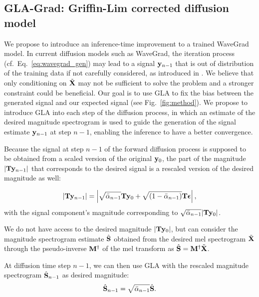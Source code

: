 \subsection{GLA-Grad: Griffin-Lim corrected diffusion model}
We propose to introduce an inference-time improvement to a trained WaveGrad model. 
In current diffusion models such as WaveGrad, the iteration process (cf.\ Eq.~\eqref{eq:wavegrad_gen}) may lead to a signal $\mathbf{y}_{n-1}$ that is out of distribution of the training data if not carefully considered, as introduced in \cite{graham2023denoising}. We believe that only conditioning on $\tilde{\mathbf{X}}$ may not be sufficient to solve the problem and a stronger constraint could be beneficial. 
 Our goal is to use GLA to fix the bias between the generated signal and our expected signal (see Fig.~\ref{fig:method}). 
We propose to introduce GLA into each step of the diffusion process, in which 
an estimate of the desired magnitude spectrogram  is used to guide the generation of the signal estimate $\mathbf{y}_{n-1}$ at step $n-1$,
enabling the inference to have a better convergence.
 
Because the signal at step $n-1$ of the forward diffusion process is supposed to be obtained from a scaled version of the original $\mathbf{y}_0$, the part of the magnitude $|\mathbf{T} \mathbf{y}_{n-1}|$ that corresponds to the desired signal is a rescaled version of the desired magnitude as well: 

\begin{equation}
        \left|\mathbf{T}\mathbf{y}_{n-1}\right| = \left|\sqrt{\bar{\alpha}_{n-1}}\mathbf{T}  \mathbf{y}_0+ \sqrt{\left(1-\bar{\alpha}_{n-1}\right)} \mathbf{T}  \boldsymbol{\epsilon} \right|,
\label{equ-Tyn}
\end{equation}
with the signal component's magnitude corresponding to $\sqrt{\bar{\alpha}_{n-1}}|\mathbf{T}  \mathbf{y}_0| $.

We do not have access to the desired magnitude $|\mathbf{T} \mathbf{y}_0|$, but can consider the magnitude spectrogram estimate $\hat{\mathbf{S}}$ obtained from the desired mel spectrogram $\tilde{\mathbf{X}}$ 
through the pseudo-inverse $\mathbf{M}^\dagger$ of the mel transform as $\hat{\mathbf{S}} = \mathbf{M}^\dagger \tilde{\mathbf{X}}$. 

At diffusion time step $n-1$, we can then use GLA with the rescaled magnitude spectrogram $\hat{\mathbf{S}}_{n-1}$ as desired magnitude:
\begin{equation}
\hat{\mathbf{S}}_{n-1} = \sqrt{\bar{\alpha}_{n-1}}\hat{\mathbf{S}}.
\end{equation}


